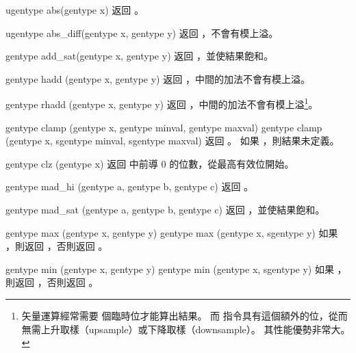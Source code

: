 ugentype abs(gentype x)
\stopbuffer
{}
返回 。
\stopbuffer

ugentype abs_diff(gentype x,
		gentype y)
\stopbuffer
{}
返回 ，不會有模上溢。
\stopbuffer

gentype add_sat(gentype x,
		gentype y)
\stopbuffer
{}
返回 ，並使結果飽和。
\stopbuffer

gentype hadd (gentype x,
		gentype y)
\stopbuffer
{}
返回 ，中間的加法不會有模上溢。
\stopbuffer

gentype rhadd (gentype x,
		gentype y)
\stopbuffer
{}
返回 ，中間的加法不會有模上溢\footnote{
矢量運算經常需要  個臨時位才能算出結果。
而  指令具有這個額外的位，從而無需上升取樣（upsample）或下降取樣（downsample）。
其性能優勢非常大。}。
\stopbuffer

gentype clamp (gentype x,
		gentype minval,
		gentype maxval)
gentype clamp (gentype x,
		sgentype minval,
		sgentype maxval)
\stopbuffer
{}
返回 。
如果 ，則結果未定義。
\stopbuffer

gentype clz (gentype x)
\stopbuffer
{}
返回  中前導 0 的位數，從最高有效位開始。
\stopbuffer

gentype mad_hi (gentype a,
		gentype b,
		gentype c)
\stopbuffer
{}
返回 。
\stopbuffer

gentype mad_sat (gentype a,
		gentype b,
		gentype c)
\stopbuffer
{}
返回 ，並使結果飽和。
\stopbuffer

gentype max (gentype x, gentype y)
gentype max (gentype x, sgentype y)
\stopbuffer
{}
如果 ，則返回 ，否則返回 。
\stopbuffer

gentype min (gentype x, gentype y)
gentype min (gentype x, sgentype y)
\stopbuffer
{}
如果 ，則返回 ，否則返回 。
\stopbuffer


